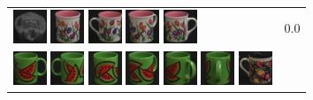 {\begin{figure}[p]
\begin{tabular}{m{11cm} | m{3cm} |}
\includegraphics[width=1cm]{coil/beeld-29.eps}
\includegraphics[width=1cm]{coil/beeld-8.eps}
\includegraphics[width=1cm]{coil/beeld-7.eps}
\includegraphics[width=1cm]{coil/beeld-9.eps}
\includegraphics[width=1cm]{coil/beeld-6.eps}
& {\scriptsize 0.0}
\\
\includegraphics[width=1cm]{coil/beeld-30.eps}
\includegraphics[width=1cm]{coil/beeld-31.eps}
\includegraphics[width=1cm]{coil/beeld-32.eps}
\includegraphics[width=1cm]{coil/beeld-33.eps}
\includegraphics[width=1cm]{coil/beeld-34.eps}
\includegraphics[width=1cm]{coil/beeld-35.eps}
\includegraphics[width=1cm]{coil/beeld-61.eps}

\end{tabular}
\end{figure}}
